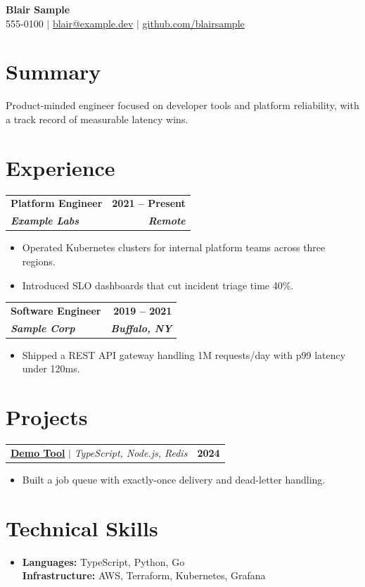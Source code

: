 \documentclass[letterpaper,10.5pt]{article}
\makeatletter
\newcommand{\roleheading}[4]{%
  \vspace{2pt}%
  \begin{tabular*}{\textwidth}[t]{l@{\extracolsep{\fill}}r}
    \textbf{#1} & \textbf{\small #2} \\
    \textbf{\textit{\small #3}} & \textbf{\textit{\small #4}} \\
  \end{tabular*}%
}
\newcommand{\projheading}[2]{%
  \vspace{2pt}%
  \begin{tabular*}{\textwidth}[t]{l@{\extracolsep{\fill}}r}
    \small #1 & \textbf{\small #2} \\
  \end{tabular*}%
}
\newcommand{\bul}[1]{%
  \item \small{#1}\vspace{-1pt}%
}
\newcommand{\bullist}{\begin{itemize}[leftmargin=12pt, label={\tiny$\bullet$}, topsep=1pt, itemsep=0pt, parsep=0pt]}
\newcommand{\stopbulls}{\end{itemize}\vspace{-2.75pt}}
\makeatother
\begin{document}
\begin{center}
  {\LARGE\bfseries Blair Sample}\\\vspace{2pt}
  \small
  555-0100 $|$ \href{mailto:blair@example.dev}{blair@example.dev} $|$ \href{https://github.com/blairsample}{github.com/blairsample}
\end{center}
\vspace{-15pt}

\section{Summary}
\vspace{-2pt}
\small{Product-minded engineer focused on developer tools and platform reliability, with a track record of measurable latency wins.}
\vspace{-7pt}

\section{Experience}
\vspace{-2pt}
\roleheading{Platform Engineer}{2021 -- Present}{Example Labs}{Remote}
\bullist
  \bul{Operated Kubernetes clusters for internal platform teams across three regions.}
  \bul{Introduced SLO dashboards that cut incident triage time 40\%.}
\stopbulls
\vspace{3pt}

\roleheading{Software Engineer}{2019 -- 2021}{Sample Corp}{Buffalo, NY}
\bullist
  \bul{Shipped a REST API gateway handling 1M requests/day with p99 latency under 120ms.}
\stopbulls
\vspace{-7pt}

\section{Projects}
\vspace{-2pt}
\projheading{\textbf{\href{https://github.com/blairsample/demo}{Demo Tool}} $|$ \emph{TypeScript, Node.js, Redis}}{2024}
\bullist
  \bul{Built a job queue with exactly-once delivery and dead-letter handling.}
\stopbulls
\vspace{-7pt}

\section{Technical Skills}
\vspace{-2pt}
\begin{itemize}[leftmargin=0pt, label={}, topsep=0pt, itemsep=1pt, parsep=0pt]
  \small\item
    \textbf{Languages:} TypeScript, Python, Go \\
    \textbf{Infrastructure:} AWS, Terraform, Kubernetes, Grafana \\
\end{itemize}
\vspace{-7pt}
\end{document}
